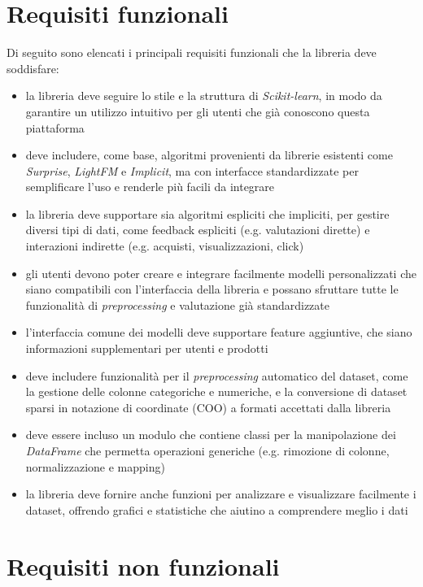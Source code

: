 \section{Requisiti funzionali}

Di seguito sono elencati i principali requisiti funzionali che la libreria deve soddisfare:

\begin{itemize}
    \item la libreria deve seguire lo stile e la struttura di \textit{Scikit-learn}, in modo da garantire un utilizzo intuitivo per gli utenti che già conoscono questa piattaforma
    \item deve includere, come base, algoritmi provenienti da librerie esistenti come \textit{Surprise}, \textit{LightFM} e \textit{Implicit}, ma con interfacce standardizzate per semplificare l'uso e renderle più facili da integrare
    \item la libreria deve supportare sia algoritmi espliciti che impliciti, per gestire diversi tipi di dati, come feedback espliciti (e.g. valutazioni dirette) e interazioni indirette (e.g. acquisti, visualizzazioni, click)
    \item gli utenti devono poter creare e integrare facilmente modelli personalizzati che siano compatibili con l'interfaccia della libreria e possano sfruttare tutte le funzionalità di \textit{preprocessing} e valutazione già standardizzate
    \item l'interfaccia comune dei modelli deve supportare feature aggiuntive, che siano informazioni supplementari per utenti e prodotti
    \item deve includere funzionalità per il \textit{preprocessing} automatico del dataset, come la gestione delle colonne categoriche e numeriche, e la conversione di dataset sparsi in notazione di coordinate (COO) a formati accettati dalla libreria
    \item deve essere incluso un modulo che contiene classi per la manipolazione dei \textit{DataFrame} che permetta operazioni generiche (e.g. rimozione di colonne, normalizzazione e mapping)
    \item la libreria deve fornire anche funzioni per analizzare e visualizzare facilmente i dataset, offrendo grafici e statistiche che aiutino a comprendere meglio i dati
\end{itemize}

\section{Requisiti non funzionali}


